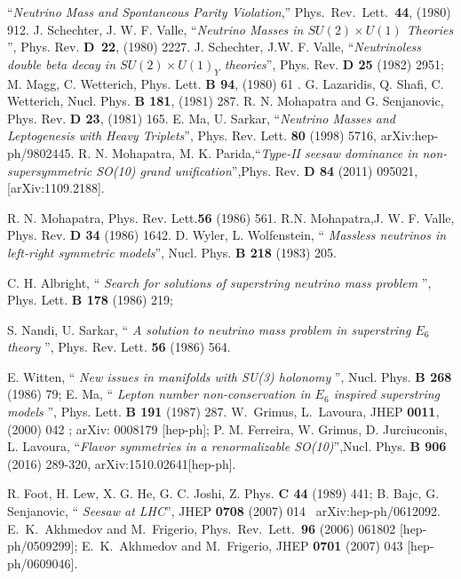 \documentclass[a4paper,11pt]{article}
\begin{document}
\begin{thebibliography}{99}
  ``{\em Neutrino Mass and Spontaneous Parity Violation},''
  Phys.\ Rev.\ Lett.\  {\bf 44}, (1980)  912.
 J. Schechter, J. W. F. Valle, ``{\em Neutrino Masses in $SU(2)\times U(1)$ Theories }'', Phys. Rev. {\bf D\, 22},  (1980) 2227.
  J. Schechter, J.W. F.  Valle, ``{\em Neutrinoless double beta decay in
  $SU(2)\times U(1)_Y$ theories}'', Phys. Rev. {\bf D 25} (1982) 2951;
 M. Magg, C. Wetterich, Phys. Lett. {\bf B 94},  (1980) 61 .
 G. Lazaridis, Q. Shafi, C. Wetterich,
 Nucl. Phys. {\bf B 181}, (1981) 287.
 R. N. Mohapatra and G. Senjanovic,
  Phys. Rev. {\bf D 23}, (1981)  165.
  E. Ma, U. Sarkar, ``{\em Neutrino Masses and
  Leptogenesis with Heavy Triplets}'', Phys. Rev. Lett. {\bf 80}
  (1998) 5716, arXiv:hep-ph/9802445. 
 R. N. Mohapatra, M. K. Parida,``{\em Type-II seesaw dominance in non-supersymmetric SO(10) grand unification}'',Phys. Rev. {\bf D  84} (2011) 095021,[arXiv:1109.2188].    

 R. N. Mohapatra, Phys. Rev. Lett.{\bf 56}
  (1986) 561.
R.N. Mohapatra,J. W. F. Valle, Phys. Rev. {\bf D 34}
  (1986) 1642.
  D. Wyler, L. Wolfenstein, `` {\em Massless neutrinos
  in left-right symmetric models}'', Nucl. Phys. {\bf B 218} (1983)
  205.

C. H. Albright, `` {\em Search for solutions of superstring
    neutrino mass problem }'',  Phys. Lett. {\bf B 178} (1986) 219;  

  S. Nandi, U. Sarkar, `` {\em A solution to neutrino mass problem in
  superstring $E_6$ theory }'', Phys. Rev. Lett. {\bf 56} (1986) 564.

 E. Witten, `` {\em New issues in manifolds with SU(3)
  holonomy }'', Nucl. Phys. {\bf B 268} (1986) 79;
E. Ma, `` {\em Lepton number non-conservation in $E_6$ inspired
  superstring models }'', Phys. Lett. {\bf B 191} (1987) 287.
  W.~Grimus, L.~Lavoura, JHEP {\bf 0011}, (2000)   042 ; arXiv:
  0008179 [hep-ph];
 P. M. Ferreira, W. Grimus, D. Jurciuconis,
  L. Lavoura, ``{\em Flavor symmetries in a renormalizable
    SO(10)}'',Nucl. Phys. {\bf B 906} (2016) 289-320,
  arXiv:1510.02641[hep-ph].

 R. Foot, H. Lew, X. G. He, G. C. Joshi,
  Z. Phys. {\bf C 44} (1989) 441; B. Bajc,  G. Senjanovic, ``{\em
    Seesaw at LHC}'', JHEP {\bf 0708} (2007) 014 ~arXiv:hep-ph/0612092. 
 E.~K.~Akhmedov and M.~Frigerio,
  Phys.\ Rev.\ Lett.\  {\bf 96} (2006) 061802
  [hep-ph/0509299]; 
  E.~K.~Akhmedov and M.~Frigerio,
  JHEP {\bf 0701} (2007) 043
  [hep-ph/0609046].


\end{thebibliography}
\end{document}
